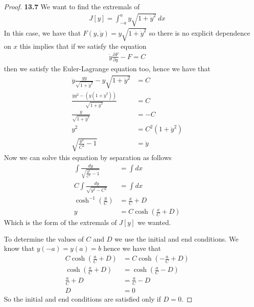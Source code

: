 \documentclass[11pt]{article}
\theoremstyle{definition}
\begin{document}
\begin{proof}{\textbf{13.7}}
    We want to find the extremals of
    \begin{align*}
        J[y] = \int_{-a}^a y\sqrt{1 + \dot y^2}~dx
    \end{align*}
    In this case, we have that
    $F(y,\dot{y}) = y \sqrt{1 + \dot y^2}$
    so there is no explicit dependence on $x$ this implies that if we
    satisfy the equation
    \begin{align*}
        \dot{y}\frac{\partial F}{\partial\dot{y}} - F = C
    \end{align*}
    then we satisfy the Euler-Lagrange equation too, hence we have that
    \begin{align*}
        \dot{y} \frac{y\dot y}{\sqrt{1 + \dot y^2}} - y \sqrt{1 + \dot y^2} &= C\\
        \frac{\dot yy^2 - (y(1  + \dot{y}^2))}{\sqrt{1 + \dot y^2}} &= C\\
        \frac{y}{\sqrt{1 + \dot y^2}} &= -C\\
        y^2 &= C^2(1 + \dot y^2)\\
        \sqrt{\frac{y^2}{C^2} - 1} &=  \dot y
    \end{align*}
    Now we can solve this equation by separation as follows
    \begin{align*}
        \int \frac{dy}{\sqrt{\frac{y^2}{C^2} - 1}} &= \int dx\\
        C\int \frac{dy}{\sqrt{y^2 - C^2}} &= \int dx\\
        \cosh^{-1}\left(\frac{y}{C}\right) &= \frac{x}{C} + D\\
        y &= C\cosh\left(\frac{x}{C} + D\right)
    \end{align*}
    Which is the form of the extremals of $J[y]$ we wanted.

    To determine the values of $C$ and $D$ we use the initial and end
    conditions. We know that $y(-a) = y(a) = b$ hence we have that
    \begin{align*}
        C\cosh\left(\frac{a}{C} + D\right) &= C\cosh\left(-\frac{a}{C} + D\right)\\
        \cosh\left(\frac{a}{C} + D\right) &= \cosh\left(\frac{a}{C} - D\right)\\
        \frac{a}{C} + D &= \frac{a}{C} - D\\
        D &= 0
    \end{align*}
    So the initial and end conditions are satisfied only if $D = 0$.


\end{proof}
\end{document}
